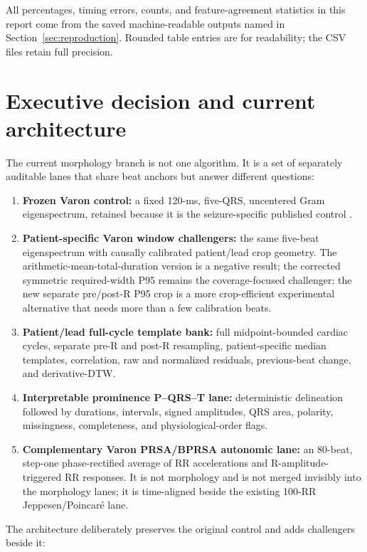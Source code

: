 \documentclass[11pt,a4paper]{article}
\begin{document}
All percentages, timing errors, counts, and feature-agreement statistics in this report come from the saved machine-readable outputs named in Section~\ref{sec:reproduction}. Rounded table entries are for readability; the CSV files retain full precision.

\section{Executive decision and current architecture}

The current morphology branch is not one algorithm. It is a set of separately auditable lanes that share beat anchors but answer different questions:

\begin{enumerate}
  \item \textbf{Frozen Varon control:} a fixed 120-ms, five-QRS, uncentered Gram eigenspectrum, retained because it is the seizure-specific published control \cite{varon2015}.
  \item \textbf{Patient-specific Varon window challengers:} the same five-beat eigenspectrum with causally calibrated patient/lead crop geometry. The arithmetic-mean-total-duration version is a negative result; the corrected symmetric required-width P95 remains the coverage-focused challenger; the new separate pre/post-R P95 crop is a more crop-efficient experimental alternative that needs more than a few calibration beats.
  \item \textbf{Patient/lead full-cycle template bank:} full midpoint-bounded cardiac cycles, separate pre-R and post-R resampling, patient-specific median templates, correlation, raw and normalized residuals, previous-beat change, and derivative-DTW.
  \item \textbf{Interpretable prominence P--QRS--T lane:} deterministic delineation followed by durations, intervals, signed amplitudes, QRS area, polarity, missingness, completeness, and physiological-order flags.
  \item \textbf{Complementary Varon PRSA/BPRSA autonomic lane:} an 80-beat, step-one phase-rectified average of RR accelerations and R-amplitude-triggered RR responses. It is not morphology and is not merged invisibly into the morphology lanes; it is time-aligned beside the existing 100-RR Jeppesen/Poincar\'e lane.
\end{enumerate}

The architecture deliberately preserves the original control and adds challengers beside it:
\end{document}
